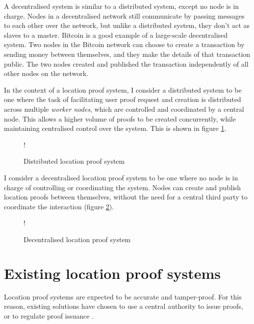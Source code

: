 A decentralised system is similar to a distributed system, except no node is in charge. Nodes in a decentralised network still communicate by passing messages to each other over the network, but unlike a distributed system, they don't act as slaves to a master. Bitcoin \cite{bitcoin} is a good example of a large-scale decentralised system. Two nodes in the Bitcoin network can choose to create a transaction by sending money between themselves, and they make the details of that transaction public. The two nodes created and published the transaction independently of all other nodes on the network.

In the context of a location proof system, I consider a distributed system to be one where the task of facilitating user proof request and creation is distributed across multiple \textit{worker nodes}, which are controlled and coordinated by a central node. This allows a higher volume of proofs to be created concurrently, while maintaining centralised control over the system. This is shown in figure \ref{fig:distributed_location}.

\begin{figure}[H]
\begin{center}
 {!} {}
\end{center}
\caption{Distributed location proof system}
\label{fig:distributed_location}
\end{figure}

I consider a decentralised location proof system to be one where no node is in charge of controlling or coordinating the system. Nodes can create and publish location proofs between themselves, without the need for a central third party to coordinate the interaction (figure \ref{fig:decentralised_location}).

\begin{figure}[H]
\begin{center}
 {!} {}
\end{center}
\caption{Decentralised location proof system}
\label{fig:decentralised_location}
\end{figure}

\section{Existing location proof systems} \label{ssec:proof_systems}
Location proof systems are expected to be accurate and tamper-proof. For this reason, existing solutions have chosen to use a central authority to issue proofs, or to regulate proof issuance \cite{brassil, luo, khan}.

